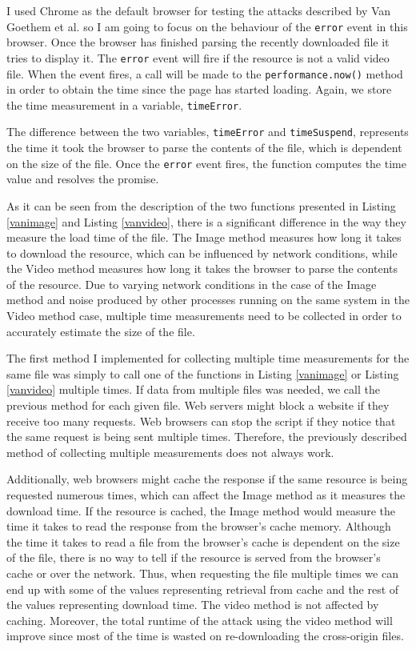 \documentclass[10pt,a4paper,twoside]{book}
\begin{document}
I used Chrome as the default browser for testing the attacks described by Van Goethem et al. \cite{van2015clock} so I am going to focus on the behaviour of the \texttt{error} event in this browser. Once the browser has finished parsing the recently downloaded file it tries to display it. The \texttt{error} event will fire if the resource is not a valid video file. When the event fires, a call will be made to the \texttt{performance.now()} method in order to obtain the time since the page has started loading. Again, we store the time measurement in a variable, \texttt{timeError}.

The difference between the two variables, \texttt{timeError} and \texttt{timeSuspend}, represents the time it took the browser to parse the contents of the file, which is dependent on the size of the file. Once the \texttt{error} event fires, the function computes the time value and resolves the promise.

As it can be seen from the description of the two functions presented in Listing \ref{vanimage} and Listing \ref{vanvideo}, there is a significant difference in the way they measure the load time of the file. The Image method measures how long it takes to download the resource, which can be influenced by network conditions, while the Video method measures how long it takes the browser to parse the contents of the resource. Due to varying network conditions in the case of the Image method and noise produced by other processes running on the same system in the Video method case, multiple time measurements need to be collected in order to accurately estimate the size of the file. 

The first method I implemented for collecting multiple time measurements for the same file was simply to call one of the functions in Listing \ref{vanimage} or Listing \ref{vanvideo} multiple times. If data from multiple files was needed, we call the previous method for each given file. Web servers might block a website if they receive too many requests. Web browsers can stop the script if they notice that the same request is being sent multiple times. Therefore, the previously described method of collecting multiple measurements does not always work. 

Additionally, web browsers might cache the response if the same resource is being requested numerous times, which can affect the Image method as it measures the download time. If the resource is cached, the Image method would measure the time it takes to read the response from the browser's cache memory. Although the time it takes to read a file from the browser's cache is dependent on the size of the file, there is no way to tell if the resource is served from the browser's cache or over the network. Thus, when requesting the file multiple times we can end up with some of the values representing retrieval from cache and the rest of the values representing download time. The video method is not affected by caching. Moreover, the total runtime of the attack using the video method will improve since most of the time is wasted on re-downloading the cross-origin files. 
\end{document}
